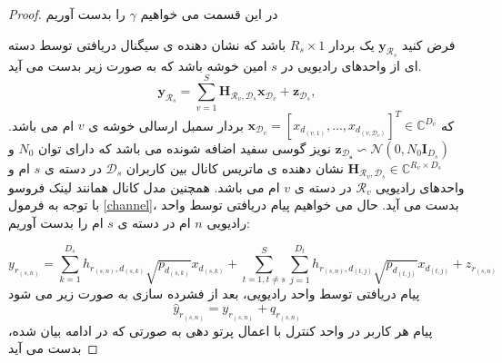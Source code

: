 \begin{proof}
در این قسمت می خواهیم $\gamma$ را بدست آوریم

فرض کنید $\boldsymbol{y}_{\mathcal{R}_s}$ یک بردار
 $R_s \times 1$
باشد که نشان دهنده ی سیگنال دریافتی توسط دسته ای از واحدهای رادیویی در $s$
امین خوشه باشد که به صورت زیر بدست می آید.
\begin{equation} \label{1}
\boldsymbol{y}_{\mathcal{R}_s} = \sum_{v=1}^S \boldsymbol{H}_{\mathcal{R}_v,\mathcal{D}_s}{\boldsymbol{x}}_{\mathcal{D}_v}+ \boldsymbol{z}_{\mathcal{D}_s},
\end{equation}
که   ${\boldsymbol{x}}_{ \mathcal{D}_v} = [{x}_{ d_{(v,1)}},...,{ x}_{ d_{(v,\mathcal{D}_v)}}]^T \in \mathbb{C}^{{D}_v } $ 
بردار سمبل ارسالی خوشه ی  $v$ ام می باشد.\newline
 $\boldsymbol{z_{\mathcal{D}_s}} \backsim \mathcal{N}(0,N_0\boldsymbol{I}_{{D}_s})$ 
 نویز گوسی سفید اضافه شونده می باشد که دارای توان $N_0$
 و \newline
 $\boldsymbol{H}_{\mathcal{R}_v,\mathcal{D}_s}  \in \mathbb{C}^{{R}_v\times {D}_s}$ 
 نشان دهنده ی ماتریس کانال بین  کاربران $\mathcal{D}_s$ در دسته ی
 $s$
   ام و واحدهای رادیویی   $\mathcal{R}_v$ در دسته ی   $v$ ام می باشد.\newline
همچنین مدل کانال همانند لینک فروسو با توجه به فرمول \eqref{channel}، بدست می آید.
 حال می خواهیم پیام دریافتی توسط واحد رادیویی  $n$ ام در دسته ی $s$ ام را بدست آوریم:
 
\begin{equation} \label{100}
y_{r_{(s,n)}} = \sum_{k=1}^{D_s} h_{r_{(s,n)},d_{(s,k)}} \sqrt{p_{d_{(s,k)}}}  x_{d_{(s,k)}}
+\sum_{t=1,t\neq s}^{S} \sum_{j=1}^{D_t} h_{r_{(s,n)},d_{(t,j)}} \sqrt{p_{d_{(t,j)}}} x_{d_{(t,j)}}
 +z_{r_{(s,n)}}
\end{equation}
پیام دریافتی توسط واحد رادیویی، بعد از فشرده سازی به صورت زیر می شود
\begin{equation}
\hat{y}_{r_{(s,n)}} = y_{r_{(s,n)}} + q_{r_{(s,n)}} 
\end{equation}
پیام هر کاربر در واحد کنترل با اعمال پرتو دهی  به صورتی که در ادامه بیان شده، بدست می آید


\end{proof}
